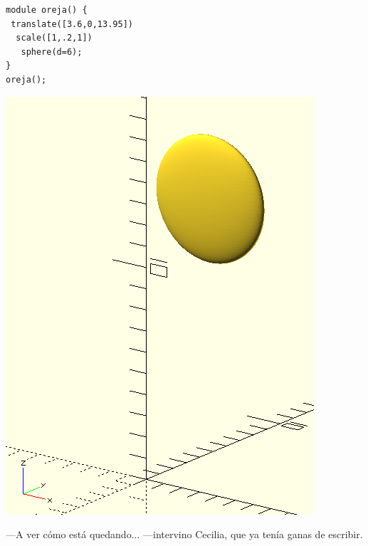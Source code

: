           \begin{center}
  \begin{minipage}[]{.6\textwidth}
    \begin{lstlisting}
module oreja() {
 translate([3.6,0,13.95])
  scale([1,.2,1])
   sphere(d=6);
}
oreja();
\end{lstlisting}
  \end{minipage}\hfill
  \begin{minipage}[]{.4\textwidth}
      \centering
      \includegraphics[width=.7\textwidth]{imagenes/oreja}
    \end{minipage}
  \end{center}

  ---A ver cómo está quedando... ---intervino Cecilia, que ya tenía
  ganas de escribir.

